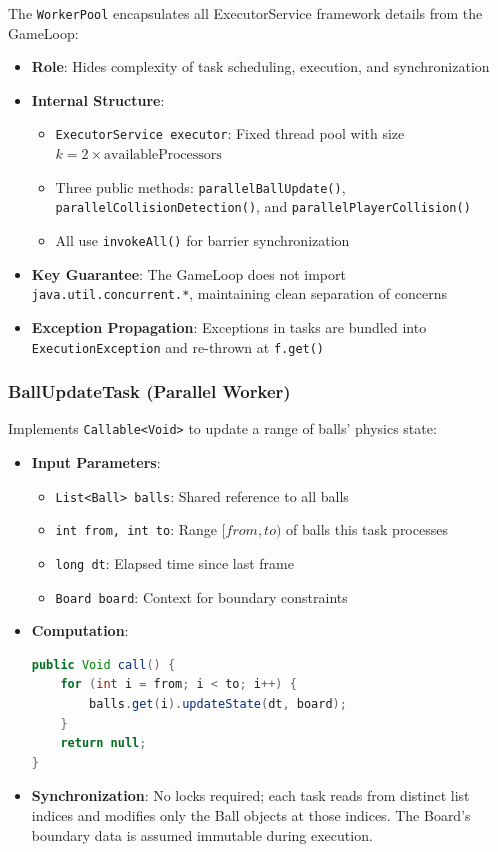 \documentclass[12pt,a4paper]{article}
\begin{document}
The \texttt{WorkerPool} encapsulates all ExecutorService framework details from the GameLoop:
 
\begin{itemize}
    \item \textbf{Role}: Hides complexity of task scheduling, execution, and synchronization
    \item \textbf{Internal Structure}:
    \begin{itemize}
        \item \texttt{ExecutorService executor}: Fixed thread pool with size $k = 2 \times \text{availableProcessors}$
        \item Three public methods: \texttt{parallelBallUpdate()}, \texttt{parallelCollisionDetection()}, and \texttt{parallelPlayerCollision()}
        \item All use \texttt{invokeAll()} for barrier synchronization
    \end{itemize}
    \item \textbf{Key Guarantee}: The GameLoop does not import \texttt{java.util.concurrent.*}, maintaining clean separation of concerns
    \item \textbf{Exception Propagation}: Exceptions in tasks are bundled into \texttt{ExecutionException} and re-thrown at \texttt{f.get()}
\end{itemize}
 
\subsubsection*{BallUpdateTask (Parallel Worker)}
 
Implements \texttt{Callable<Void>} to update a range of balls' physics state:
 
\begin{itemize}
    \item \textbf{Input Parameters}:
    \begin{itemize}
        \item \texttt{List<Ball> balls}: Shared reference to all balls
        \item \texttt{int from, int to}: Range $[from, to)$ of balls this task processes
        \item \texttt{long dt}: Elapsed time since last frame
        \item \texttt{Board board}: Context for boundary constraints
    \end{itemize}
    \item \textbf{Computation}:
    \begin{lstlisting}[language=Java, caption=BallUpdateTask Execution]
public Void call() {
    for (int i = from; i < to; i++) {
        balls.get(i).updateState(dt, board);
    }
    return null;
}
    \end{lstlisting}
    \item \textbf{Synchronization}: No locks required; each task reads from distinct list indices and modifies only the Ball objects at those indices. The Board's boundary data is assumed immutable during execution.
\end{itemize}
 
\end{document}
